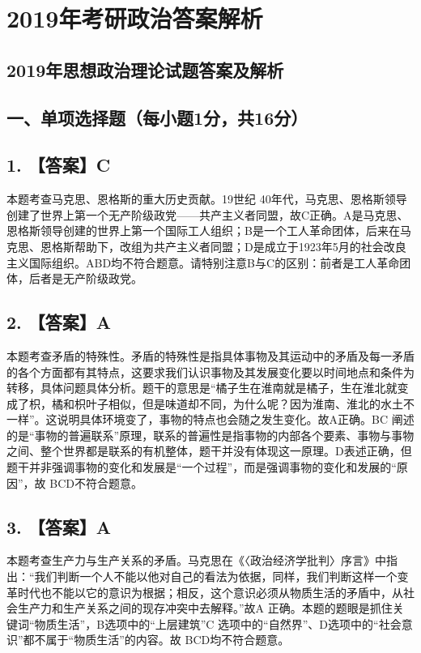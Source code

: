 \documentclass[UTF8,11pt]{ctexart}
\begin{document}
\section*{2019年考研政治答案解析}
\subsection*{2019年思想政治理论试题答案及解析}

\subsection*{一、单项选择题（每小题1分，共16分）}

\subsection*{1. 【答案】C}

本题考查马克思、恩格斯的重大历史贡献。19世纪 40年代，马克思、恩格斯领导创建了世界上第一个无产阶级政党——共产主义者同盟，故C正确。A是马克思、恩格斯领导创建的世界上第一个国际工人组织；B是一个工人革命团体，后来在马克思、恩格斯帮助下，改组为共产主义者同盟；D是成立于1923年5月的社会改良主义国际组织。ABD均不符合题意。请特别注意B与C的区别：前者是工人革命团体，后者是无产阶级政党。


\subsection*{2. 【答案】A}

本题考查矛盾的特殊性。矛盾的特殊性是指具体事物及其运动中的矛盾及每一矛盾的各个方面都有其特点，这要求我们认识事物及其发展变化要以时间地点和条件为转移，具体问题具体分析。题干的意思是“橘子生在淮南就是橘子，生在淮北就变成了枳，橘和枳叶子相似，但是味道却不同，为什么呢？因为淮南、淮北的水土不一样”。这说明具体环境变了，事物的特点也会随之发生变化。故A正确。BC 阐述的是“事物的普遍联系”原理，联系的普遍性是指事物的内部各个要素、事物与事物之间、整个世界都是联系的有机整体，题干并没有体现这一原理。D表述正确，但题干并非强调事物的变化和发展是“一个过程”，而是强调事物的变化和发展的“原因”，故 BCD不符合题意。


\subsection*{3. 【答案】A}

本题考查生产力与生产关系的矛盾。马克思在《〈政治经济学批判〉序言》中指出：“我们判断一个人不能以他对自己的看法为依据，同样，我们判断这样一个变革时代也不能以它的意识为根据；相反，这个意识必须从物质生活的矛盾中，从社会生产力和生产关系之间的现存冲突中去解释。”故A 正确。本题的题眼是抓住关键词“物质生活”，B选项中的“上层建筑”C 选项中的“自然界”、D选项中的“社会意识”都不属于“物质生活”的内容。故 BCD均不符合题意。
\end{document}
